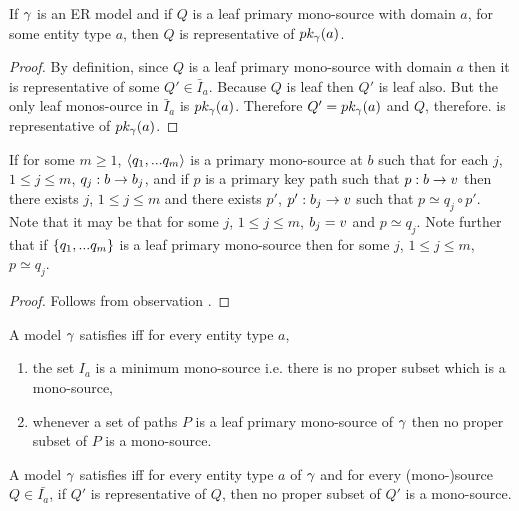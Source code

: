 \begin{lemma}
If $\gamma$ is an ER model and if $Q$ is a leaf primary mono-source with domain $a$, for some entity type $a$, then $Q$ is representative of $pk_{\gamma}(a)$.
\end{lemma}
\begin{proof}
By definition, since $Q$ is a leaf primary mono-source with domain $a$ then it is representative of some $Q' \in \bar{I}_a$. Because
$Q$ is leaf then $Q'$ is leaf also. But the only leaf monos-ource in $\bar{I}_a$ is $pk_{\gamma}(a)$. Therefore $Q'=pk_{\gamma}(a)$ and $Q$, therefore.
is representative of  $pk_{\gamma}(a)$.
\end{proof}


\begin{lemma}
If for some $m \geq 1$, $\langle q_1,...q_m\rangle$ is a primary mono-source at $b$ such that for each $j$, $1 \leq j \leq m$, $q_j : b \rightarrow b_j$,
and if  $p$ is a primary key path such that $p: b \rightarrow v$   
then there exists $j$, $1 \leq j \leq m$ and there exists $p'$, $p': b_j \rightarrow v$ such that $p \simeq q_j \circ p'$.
Note that it may be that for some $j$, $1 \leq j \leq m$, $b_j = v$ and $p \simeq q_j$.
Note further that if $\left\{q_1,...q_m\right\}$ is a leaf primary mono-source then for some $j$, $1 \leq j \leq m$, $p \simeq q_j$.
\end{lemma}
\begin{proof}
Follows from observation .
\end{proof}

\begin{definition}
A model $\gamma$ satisfies  iff for every entity type $a$,
\begin{enumerate}
\item the set $I_a$ is a minimum mono-source i.e. there is no proper subset which is a mono-source,
\item whenever a set of paths $P$ is a leaf primary mono-source of $\gamma$ then no proper subset of $P$ is a mono-source.
\end{enumerate}
\end{definition}

\begin{conjecture}
A model $\gamma$ satisfies  iff 
for every entity type $a$ of $\gamma$ and for every (mono-)source $Q \in \bar{I_a}$, if $Q'$ is representative
of  $Q$, then no proper subset of $Q'$ is a mono-source. 
\end{conjecture}

